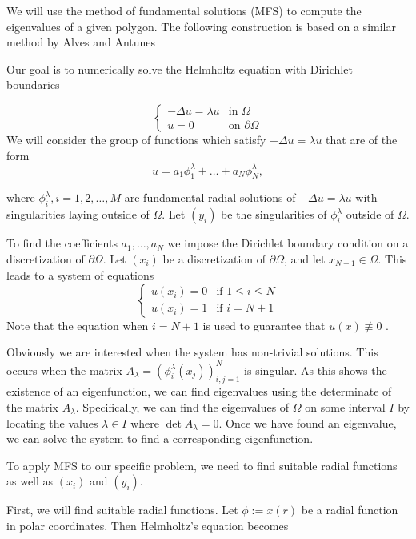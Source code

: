 \documentclass[12pt]{report}
\numberwithin{definition}{section}
\begin{document}
We will use the method of fundamental solutions (MFS) to compute the eigenvalues of a given polygon.
The following construction is based on a similar method by Alves and Antunes \cite{fund}

Our goal is to numerically solve the Helmholtz equation with Dirichlet boundaries

\[
  \begin{cases}
    - \Delta u = \lambda u  & \text{in } \Omega \\
    u = 0 & \text{on } \partial \Omega
  \end{cases}
\] 
We will consider the group of functions which satisfy $- \Delta u = \lambda u$ that are of the form
\[
  u = a_1 \phi_{1}^\lambda + \ldots + a_{N} \phi_{N}^\lambda
,\] 

where $\phi_{i}^\lambda, i = 1,2,\ldots,M$ are fundamental radial solutions of $- \Delta u = \lambda u$ with singularities laying outside of $\Omega$.
Let $(y_{i})$ be the singularities of $\phi_{i}^\lambda$ outside of $\Omega$.

To find the coefficients $a_1,\ldots,a_{N}$ we impose the Dirichlet boundary condition on a discretization of $\partial \Omega$.
Let $(x_{i})$ be a discretization of $\partial \Omega$, and let $x_{N+1} \in \Omega$.
This leads to a system of equations 
\[
  \begin{cases}
    u(x_{i}) = 0 & \text{if } 1 \leq i \leq N \\
    u(x_{i}) = 1 & \text{if } i = N + 1 
  \end{cases}
\] 
Note that the equation when $i = N + 1$ is used to guarantee that $u(x) \not\equiv 0$ \cite{fund2}.

Obviously we are interested when the system has non-trivial solutions.
This occurs when the matrix $A_{\lambda} = (\phi_{i}^{\lambda}(x_{j}))_{i,j = 1}^N$ is singular.
As this shows the existence of an eigenfunction, we can find eigenvalues using the determinate of the matrix $A_{\lambda}$.
Specifically, we can find the eigenvalues of $\Omega$ on some interval $I$ by locating the values $\lambda \in I$ where $\det A_{\lambda} = 0$.
Once we have found an eigenvalue, we can solve the system to find a corresponding eigenfunction.


To apply MFS to our specific problem, we need to find suitable radial functions as well as $(x_{i})$ and $(y_{i})$.

First, we will find suitable radial functions.
Let $\phi := x(r)$ be a radial function in polar coordinates.
Then Helmholtz's equation becomes
\end{document}
